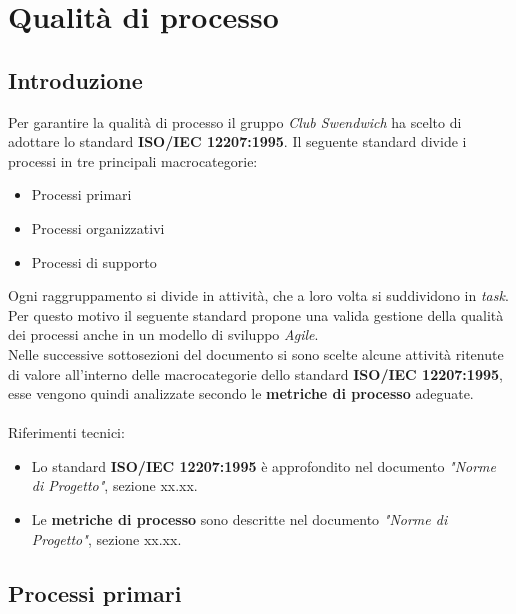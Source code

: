 \section{Qualità di processo}
\subsection{Introduzione}
Per garantire la qualità di processo il gruppo \textit{Club Swendwich} 
ha scelto di adottare lo standard \textbf{ISO/IEC 12207:1995}.
Il seguente standard divide i processi in tre principali macrocategorie:
\begin{itemize}
    \item Processi primari
    \item Processi organizzativi
    \item Processi di supporto
\end{itemize}
Ogni raggruppamento si divide in attività, che a loro volta si suddividono
in \textit{task}.\\
Per questo motivo il seguente standard propone una valida gestione della
qualità dei processi anche in un modello di sviluppo \textit{Agile}.\\
\noindent
Nelle successive sottosezioni del documento si sono scelte alcune attività ritenute di valore all'interno
delle macrocategorie dello standard \textbf{ISO/IEC 12207:1995}, esse vengono quindi analizzate
secondo le \textbf{metriche di processo} adeguate.\\
\\
\noindent
Riferimenti tecnici:
\begin{itemize}
    \item Lo standard \textbf{ISO/IEC 12207:1995} è approfondito nel documento \textit{"Norme di Progetto"},
    sezione xx.xx.
    \item Le \textbf{metriche di processo} sono descritte nel documento \textit{"Norme di Progetto"},
    sezione xx.xx.
\end{itemize}

\subsection{Processi primari}

